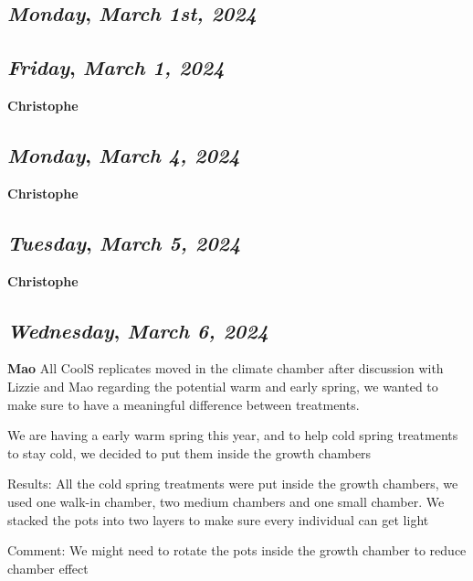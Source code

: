 \begin{center}
\section*{\month}
\end{center}

\def\day{\textit{March 1st, 2024}}
\def\weekday{\textit{Monday}}
\subsection*{\weekday, \day}

\def\day{\textit{March 1, 2024}}
\def\weekday{\textit{Friday}}
\subsection*{\weekday, \day}
\textbf {Christophe}

\def\day{\textit{March 4, 2024}}
\def\weekday{\textit{Monday}}
\subsection*{\weekday, \day}
\textbf {Christophe}

\def\day{\textit{March 5, 2024}}
\def\weekday{\textit{Tuesday}}
\subsection*{\weekday, \day}
\textbf {Christophe}

\def\day{\textit{March 6, 2024}}
\def\weekday{\textit{Wednesday}}
\subsection*{\weekday, \day}
\textbf {Mao}
All CoolS replicates moved in the climate chamber after discussion with Lizzie and Mao regarding the potential warm and early spring, we wanted to make sure to have a meaningful difference between treatments.
\par We are having a early warm spring this year, and to help cold spring treatments to stay cold, we decided to put them inside the growth chambers
\par Results: All the cold spring treatments were put inside the growth chambers, we used one walk-in chamber, two medium chambers and one small chamber. We stacked the pots into two layers to make sure every individual can get light
\par Comment: We might need to rotate the pots inside the growth chamber to reduce chamber effect

